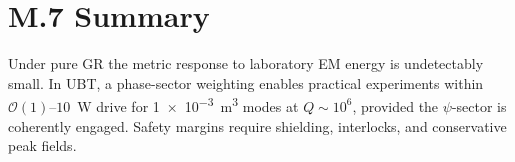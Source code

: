 \documentclass[12pt]{article}
\begin{document}
\section*{M.7 Summary}
Under pure GR the metric response to laboratory EM energy is undetectably small. In UBT, a phase-sector weighting enables practical experiments within $\mathcal{O}(1)$--$10$~W drive for \SI{1e-3}{m^3} modes at $Q\!\sim\!10^6$, provided the $\psi$-sector is coherently engaged. Safety margins require shielding, interlocks, and conservative peak fields.
\end{document}
